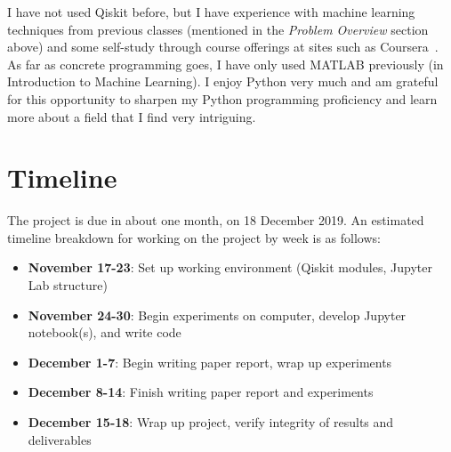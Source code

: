 \documentclass{article}
\begin{document}
  I have not used Qiskit before, but I have experience with machine learning techniques from previous classes (mentioned in the \textit{Problem Overview} section above) and some self-study through course offerings at sites such as Coursera~\cite{coursera}. As far as concrete programming goes, I have only used MATLAB previously (in Introduction to Machine Learning). I enjoy Python very much and am grateful for this opportunity to sharpen my Python programming proficiency and learn more about a field that I find very intriguing.

\section{Timeline}
  The project is due in about one month, on 18 December 2019. An estimated timeline breakdown for working on the project by week is as follows:

  \begin{itemize}
    \item \textbf{November 17-23}: Set up working environment (Qiskit modules, Jupyter Lab structure)
    \item \textbf{November 24-30}: Begin experiments on computer, develop Jupyter notebook(s), and write code
    \item \textbf{December 1-7}: Begin writing paper report, wrap up experiments
    \item \textbf{December 8-14}: Finish writing paper report and experiments
    \item \textbf{December 15-18}: Wrap up project, verify integrity of results and deliverables
  \end{itemize}

\newpage

\raggedright

\end{document}
